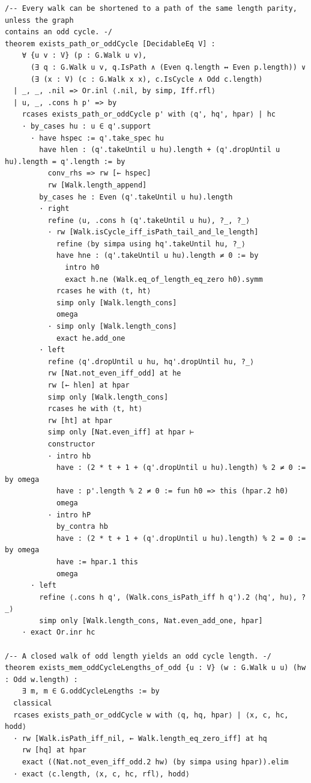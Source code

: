\begin{verbatim}
/-- Every walk can be shortened to a path of the same length parity, unless the graph
contains an odd cycle. -/
theorem exists_path_or_oddCycle [DecidableEq V] :
    ∀ {u v : V} (p : G.Walk u v),
      (∃ q : G.Walk u v, q.IsPath ∧ (Even q.length ↔ Even p.length)) ∨
      (∃ (x : V) (c : G.Walk x x), c.IsCycle ∧ Odd c.length)
  | _, _, .nil => Or.inl ⟨.nil, by simp, Iff.rfl⟩
  | u, _, .cons h p' => by
    rcases exists_path_or_oddCycle p' with ⟨q', hq', hpar⟩ | hc
    · by_cases hu : u ∈ q'.support
      · have hspec := q'.take_spec hu
        have hlen : (q'.takeUntil u hu).length + (q'.dropUntil u hu).length = q'.length := by
          conv_rhs => rw [← hspec]
          rw [Walk.length_append]
        by_cases he : Even (q'.takeUntil u hu).length
        · right
          refine ⟨u, .cons h (q'.takeUntil u hu), ?_, ?_⟩
          · rw [Walk.isCycle_iff_isPath_tail_and_le_length]
            refine ⟨by simpa using hq'.takeUntil hu, ?_⟩
            have hne : (q'.takeUntil u hu).length ≠ 0 := by
              intro h0
              exact h.ne (Walk.eq_of_length_eq_zero h0).symm
            rcases he with ⟨t, ht⟩
            simp only [Walk.length_cons]
            omega
          · simp only [Walk.length_cons]
            exact he.add_one
        · left
          refine ⟨q'.dropUntil u hu, hq'.dropUntil hu, ?_⟩
          rw [Nat.not_even_iff_odd] at he
          rw [← hlen] at hpar
          simp only [Walk.length_cons]
          rcases he with ⟨t, ht⟩
          rw [ht] at hpar
          simp only [Nat.even_iff] at hpar ⊢
          constructor
          · intro hb
            have : (2 * t + 1 + (q'.dropUntil u hu).length) % 2 ≠ 0 := by omega
            have : p'.length % 2 ≠ 0 := fun h0 => this (hpar.2 h0)
            omega
          · intro hP
            by_contra hb
            have : (2 * t + 1 + (q'.dropUntil u hu).length) % 2 = 0 := by omega
            have := hpar.1 this
            omega
      · left
        refine ⟨.cons h q', (Walk.cons_isPath_iff h q').2 ⟨hq', hu⟩, ?_⟩
        simp only [Walk.length_cons, Nat.even_add_one, hpar]
    · exact Or.inr hc

/-- A closed walk of odd length yields an odd cycle length. -/
theorem exists_mem_oddCycleLengths_of_odd {u : V} (w : G.Walk u u) (hw : Odd w.length) :
    ∃ m, m ∈ G.oddCycleLengths := by
  classical
  rcases exists_path_or_oddCycle w with ⟨q, hq, hpar⟩ | ⟨x, c, hc, hodd⟩
  · rw [Walk.isPath_iff_nil, ← Walk.length_eq_zero_iff] at hq
    rw [hq] at hpar
    exact ((Nat.not_even_iff_odd.2 hw) (by simpa using hpar)).elim
  · exact ⟨c.length, ⟨x, c, hc, rfl⟩, hodd⟩


\end{verbatim}
